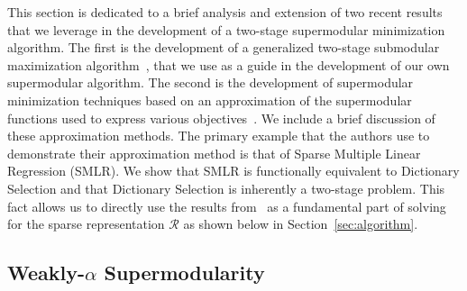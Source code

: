 \documentclass{article}
\newcommand{\Rr}{\mathcal{R}}
\begin{document}
This section is dedicated to a brief analysis and extension of two recent results that we leverage in the development of a two-stage supermodular minimization algorithm. The first is the development of a generalized two-stage submodular maximization algorithm~\cite{Singer16TwoStage}, that we use as a guide in the development of our own supermodular algorithm. The second is the development of supermodular minimization techniques based on an approximation of the supermodular functions used to express various objectives~\cite{weaklyalpha}. We include a brief discussion of these approximation methods. The primary example that the authors use to demonstrate their approximation method is that of Sparse Multiple Linear Regression (SMLR). We show that SMLR is functionally equivalent to Dictionary Selection and that Dictionary Selection is inherently a two-stage problem. This fact allows us to directly use the results from~\cite{weaklyalpha} as a fundamental part of solving for the sparse representation $\Rr$ as shown below in Section~\ref{sec:algorithm}.

\subsection{Weakly-$\alpha$ Supermodularity} \label{weakalpha}
\end{document}
